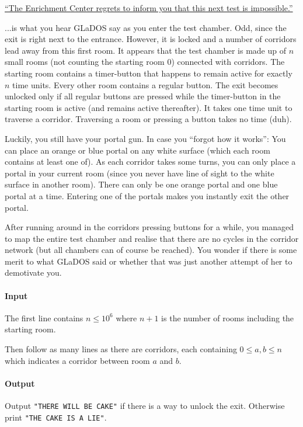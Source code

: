 




\href{https://i1.theportalwiki.net/img/d/d0/GLaDOS_05_part1_entry-1.wav}{``The Enrichment Center regrets to inform you that this next test is impossible.''}

...is what you hear GLaDOS say as you enter the test chamber. Odd, since the exit is right next to the entrance. However, it is locked and a number of corridors lead away from this first room. It appears that the test chamber is made up of $n$ small rooms (not counting the starting room $0$) connected with corridors. The starting room contains a timer-button that happens to remain active for exactly $n$ time units. Every other room contains a regular button. The exit becomes unlocked only if all regular buttons are pressed while the timer-button in the starting room is active (and remains active thereafter). It takes one time unit to traverse a corridor. Traversing a room or pressing a button takes no time (duh).

Luckily, you still have your portal gun. In case you ``forgot how it works'': You can place an orange or blue portal on any white surface (which each room contains at least one of). As each corridor takes some turns, you can only place a portal in your current room (since you never have line of sight to the white surface in another room). There can only be one orange portal and one blue portal at a time. Entering one of the portals makes you instantly exit the other portal.

After running around in the corridors pressing buttons for a while, you managed to map the entire test chamber and realise that there are no cycles in the corridor network (but all chambers can of course be reached). You wonder if there is some merit to what GLaDOS said or whether that was just another attempt of her to demotivate you.

\paragraph*{Input}

The first line contains $n\leq10^6$ where $n+1$ is the number of rooms including the starting room.

Then follow as many lines as there are corridors, each containing $0 \leq a,b \leq n$ which indicates a corridor between room $a$ and $b$.

\paragraph*{Output}

Output \texttt{"THERE WILL BE CAKE"} if there is a way to unlock the exit. Otherwise print \texttt{"THE CAKE IS A LIE"}.

\begin{samples}
\end{samples}


